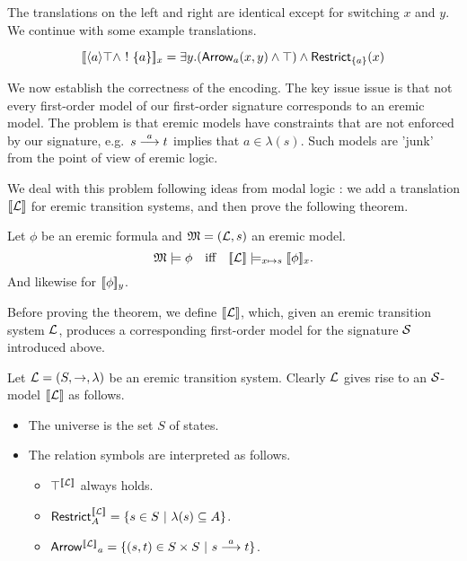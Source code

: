 \NI The translations on the left and right are identical except for
switching $x$ and $y$. We continue with some example translations.

\[
   \lbrack\!\lbrack \langle a \rangle \top \land \ ! \  \{a\} \rbrack\!\rbrack_x 
      = 
   \exists y.(\mathsf{Arrow}_{a}(x, y) \land \top ) \land \mathsf{Restrict}_{\{a\}}(x)
\]


\NI We now establish the correctness of the encoding. The key issue
issue is that not every first-order model of our first-order signature
corresponds to an eremic model. The problem is that eremic models have
constraints that are not enforced by our signature, e.g.~$s \stackrel{a}{\longrightarrow}
t$ implies that $a \in \lambda(s)$. Such models are 'junk' from the
point of view of eremic logic. 

We deal with this problem following ideas from modal logic
\cite{BlackburnP:modlog}: we add a translation $\lbrack\!\lbrack \mathcal{L} \rbrack\!\rbrack$ for
eremic transition systems, and then prove the following theorem.

\begin{theorem}\label{correspondence:theorem:1}
Let $\phi$ be an eremic formula and $\frak{M} = (\mathcal{L}, s)$ an eremic
model.
\[
   \frak{M} \models \phi \quad  \text{iff} \quad \lbrack\!\lbrack \mathcal{L} \rbrack\!\rbrack \models_{x \mapsto s} \lbrack\!\lbrack \phi \rbrack\!\rbrack_x.
\]
And likewise for $\lbrack\!\lbrack \phi \rbrack\!\rbrack_y$.
\end{theorem}

\NI Before proving the theorem, we define $\lbrack\!\lbrack \mathcal{L} \rbrack\!\rbrack$, which, given
an eremic transition system $\mathcal{L}$, produces a corresponding
first-order model for the signature $\mathcal{S}$ introduced above.

\begin{definition}
Let $\mathcal{L} = (S, \rightarrow, \lambda)$ be an eremic transition
system. Clearly $\mathcal{L}$ gives rise to an $\mathcal{S}$-model $\lbrack\!\lbrack \mathcal{L} \rbrack\!\rbrack$ as
follows.
\begin{itemize}

\item The universe is the set $S$ of states.

\item The relation symbols are interpreted as follows.

  \begin{itemize}

    \item $\top^{\lbrack\!\lbrack \mathcal{L} \rbrack\!\rbrack}$ always holds.

    \item $\mathsf{Restrict}_{A}^{\lbrack\!\lbrack \mathcal{L} \rbrack\!\rbrack} = \{ s \in S\ |\ \lambda(s) \subseteq A\}$.

    \item $\mathsf{Arrow^{\lbrack\!\lbrack \mathcal{L} \rbrack\!\rbrack}}_{a} = \{(s, t) \in S \times S\ |\ s \stackrel{a}{\longrightarrow} t\}$.

  \end{itemize}
\end{itemize}
\end{definition}

